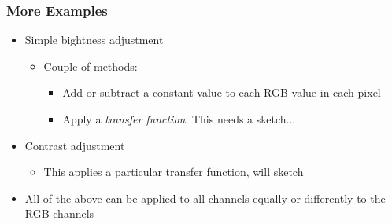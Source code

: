 \documentclass[14pt]{beamer}
\begin{document}
\begin{frame}
\frametitle{More Examples}
\begin{itemize}
\item Simple bightness adjustment
	\begin{itemize}
		\item Couple of methods:
			\begin{itemize}
				\item Add or subtract a constant value to each RGB value in each pixel
				\item Apply a \textit{transfer function}. This needs a sketch...
			\end{itemize}
	\end{itemize}
\item Contrast adjustment
	\begin{itemize}
		\item This applies a particular transfer function, will sketch
	\end{itemize}
\item All of the above can be applied to all channels equally or differently to the RGB channels
\end{itemize}
\end{frame}
\end{document}
